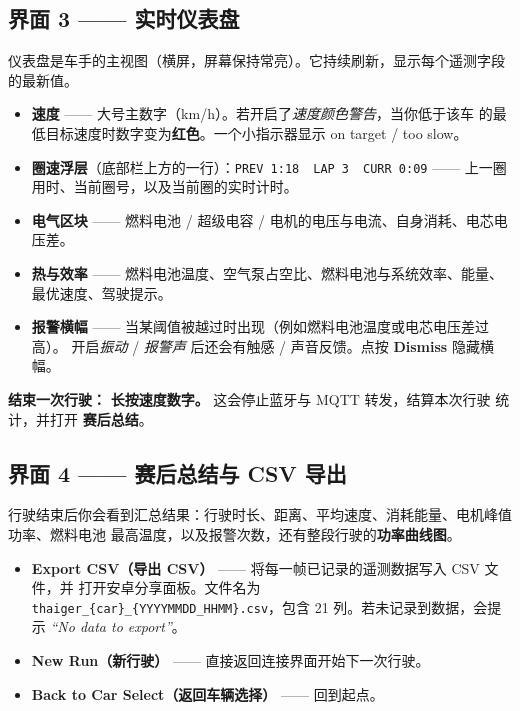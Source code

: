 \documentclass[11pt,a4paper,oneside]{report}
\newcommand{\midsep}{\,\textperiodcentered\,}
\newcommand{\ok}{\textcolor{tgreen}{\ding{51}}}
\newcommand{\nope}{\textcolor{tred}{\ding{55}}}
\newcommand{\code}[1]{\texttt{#1}}
\begin{document}
\subsection{界面 3 —— 实时仪表盘}
仪表盘是车手的主视图（横屏，屏幕保持常亮）。它持续刷新，显示每个遥测字段的最新值。
\begin{itemize}
  \item \textbf{速度} —— 大号主数字（km/h）。若开启了\emph{速度颜色警告}，当你低于该车
    的最低目标速度时数字变为\textbf{红色}。一个小指示器显示 \ok{} on target /
    \nope{} too slow。
  \item \textbf{圈速浮层}（底部栏上方的一行）：\code{PREV 1:18} \midsep{} \code{LAP 3}
    \midsep{} \code{CURR 0:09} —— 上一圈用时、当前圈号，以及当前圈的实时计时。
  \item \textbf{电气区块} —— 燃料电池 / 超级电容 / 电机的电压与电流、自身消耗、电芯电压差。
  \item \textbf{热与效率} —— 燃料电池温度、空气泵占空比、燃料电池与系统效率、能量、
    最优速度、驾驶提示。
  \item \textbf{报警横幅} —— 当某阈值被越过时出现（例如燃料电池温度或电芯电压差过高）。
    开启\emph{振动} / \emph{报警声} 后还会有触感 / 声音反馈。点按 \textbf{Dismiss}
    隐藏横幅。
\end{itemize}
\begin{tgnote}
\textbf{结束一次行驶：} \textbf{长按速度数字。} 这会停止蓝牙与 MQTT 转发，结算本次行驶
统计，并打开 \textbf{赛后总结}。
\end{tgnote}

\subsection{界面 4 —— 赛后总结与 CSV 导出}
行驶结束后你会看到汇总结果：行驶时长、距离、平均速度、消耗能量、电机峰值功率、燃料电池
最高温度，以及报警次数，还有整段行驶的\textbf{功率曲线图}。
\begin{itemize}
  \item \textbf{Export CSV（导出 CSV）} —— 将每一帧已记录的遥测数据写入 CSV 文件，并
    打开安卓分享面板。文件名为 \code{thaiger\_\{car\}\_\allowbreak\{YYYYMMDD\_HHMM\}.csv}，包含 21
    列。若未记录到数据，会提示 \emph{``No data to export''}。
  \item \textbf{New Run（新行驶）} —— 直接返回连接界面开始下一次行驶。
  \item \textbf{Back to Car Select（返回车辆选择）} —— 回到起点。
\end{itemize}
\end{document}
